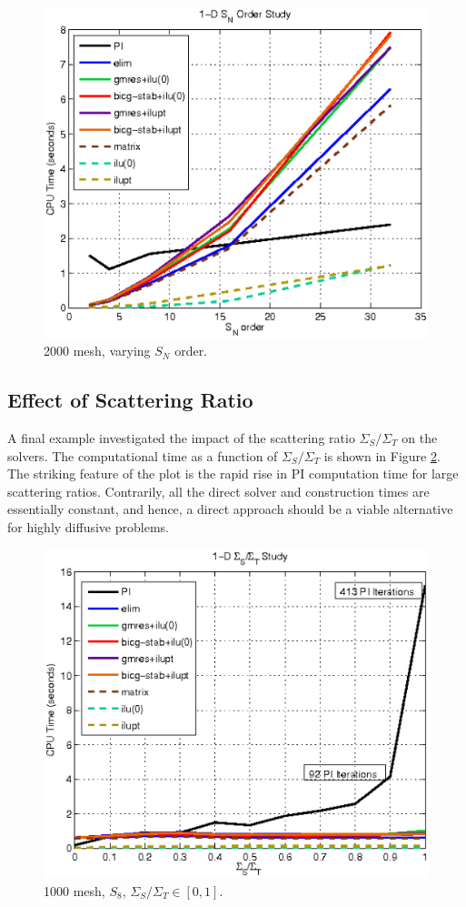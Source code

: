 \documentclass[final,3p,times,11pt]{elsarticle}
\begin{document}
  \begin{figure}[!]  
      \centering
      \includegraphics[keepaspectratio, width = 4.5 in]{one_d_sn_study}
      \caption{2000 mesh, varying $S_N$ order.}
      \label{fig:one_d_sn_study}
  \end{figure}

\subsection{Effect of Scattering Ratio}

  A final example investigated the impact of the scattering ratio $\Sigma_S/\Sigma_T$ on the solvers.  The computational time as a function of $\Sigma_S/\Sigma_T$ is shown in Figure \ref{fig:one_d_sigs_study}.  The striking feature of the plot is the rapid rise in PI computation time for large scattering ratios.  Contrarily, all the direct solver and construction times are essentially constant, and hence, a direct approach should be a viable alternative for highly diffusive problems.

  \begin{figure}[!]  
      \centering
      \includegraphics[keepaspectratio, width = 4.5 in]{one_d_sigs_study}
      \caption{1000 mesh, $S_8$, $\Sigma_S/\Sigma_T \in [0,1]$.}
      \label{fig:one_d_sigs_study}
  \end{figure}
\end{document}
